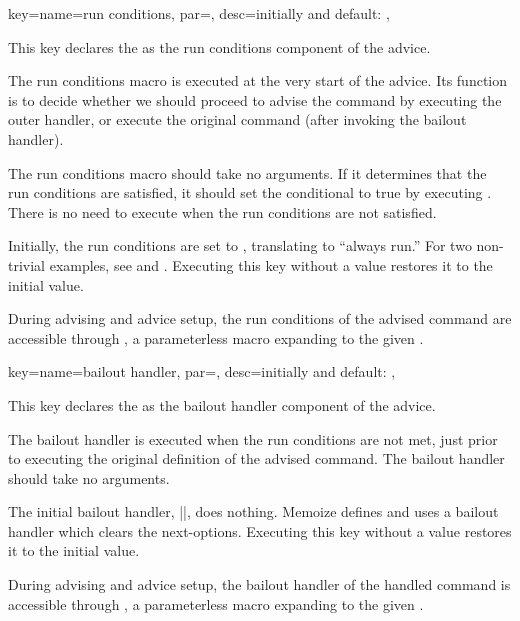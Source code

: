 \documentclass[a4paper,11pt]{article}
\begin{document}
\begingroup
{}

\begin{doc}{%
    key={name=run conditions, par=,
      desc=initially and default: },
  }
  
  This key declares the  as the run conditions component
  of the advice.

  The run conditions macro is executed at the very start of the advice.  Its
  function is to decide whether we should proceed to advise the command by
  executing the outer handler, or execute the original command (after invoking
  the bailout handler).

  The run conditions macro should take no arguments.  If it determines that the
  run conditions are satisfied, it should set the  conditional
   to true by executing .
  There is no need to execute  when the run
  conditions are not satisfied.

  Initially, the run conditions are set to , translating to
  ``always run.''  For two non-trivial examples, see  and .  Executing this
  key without a value restores it to the initial value.

  During advising and advice setup, the run conditions of the advised command
  are accessible through , a parameterless
  macro expanding to the given .
\end{doc}

\begin{doc}{%
    key={name=bailout handler, par=,
      desc=initially and default: },
  }
  
  This key declares the  as the bailout handler
  component of the advice.

  The bailout handler is executed when the run conditions are not met, just prior
  to executing the original definition of the advised command.  The bailout
  handler should take no arguments.

  The initial bailout handler, |\relax|, does nothing.  Memoize defines and
  uses a bailout handler which clears the next-options.  Executing this key
  without a value restores it to the initial value.

  During advising and advice setup, the bailout handler of the handled command is
  accessible through , a parameterless macro
  expanding to the given .
\end{doc}
\end{document}
